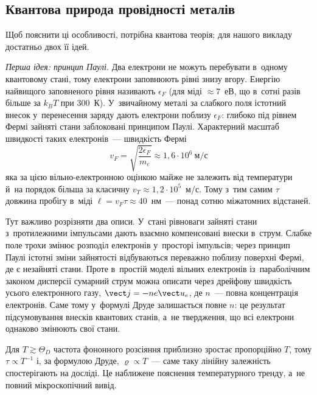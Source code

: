 \subsection*{Квантова природа провідності металів}


Щоб пояснити ці особливості, потрібна квантова теорія; для нашого викладу достатньо двох
її ідей.

\emph{Перша ідея: принцип Паулі.} Два електрони не можуть перебувати в~одному квантовому
стані, тому електрони заповнюють рівні знизу вгору. Енергію найвищого заповненого рівня
називають  $\epsilon_F$ (для міді $\approx7$~еВ, що в~сотні разів
більше за $k_BT$ при $300$~К). У~звичайному металі за слабкого поля істотний внесок у~перенесення заряду дають електрони
поблизу $\epsilon_F$: глибоко під рівнем Фермі зайняті стани заблоковані принципом Паулі.
Характерний масштаб швидкості таких електронів~--- швидкість Фермі
\begin{equation}\label{eq:FermiVelocity}
	v_F=\sqrt{\frac{2\epsilon_F}{m_e}}\approx1{,}6\cdot10^{6}\ \text{м/с}
\end{equation}
яка за цією вільно-електронною оцінкою майже не залежить від температури й~на порядок
більша за класичну $v_T\approx1{,}2\cdot10^5$~м/с. Тому з~тим самим $\tau$ довжина
пробігу в~міді $\ell=v_F\tau\approx40$~нм~--- понад сотню міжатомних відстаней.

Тут важливо розрізняти два описи. У~стані рівноваги зайняті стани з~протилежними імпульсами
дають взаємно компенсовані внески в~струм. Слабке поле трохи змінює розподіл електронів
у~просторі імпульсів; через принцип Паулі істотні зміни зайнятості відбуваються переважно
поблизу поверхні Фермі, де є незайняті стани. Проте в~простій моделі вільних електронів
із~параболічним законом дисперсії сумарний струм можна описати через дрейфову швидкість
усього електронного газу, $\vect j=-ne\vect u_e$, де $n$~--- повна концентрація електронів.
Саме тому у~формулі Друде залишається повне $n$: це результат підсумовування внесків
квантових станів, а~не твердження, що всі електрони однаково змінюють свої стани.

Для $T\gtrsim\Theta_D$ частота фононного розсіяння приблизно зростає пропорційно $T$,
тому $\tau\propto T^{-1}$ і, за формулою Друде, $\varrho\propto T$~--- саме таку лінійну
залежність спостерігають на досліді. Це наближене пояснення температурного тренду, а~не
повний мікроскопічний вивід.



